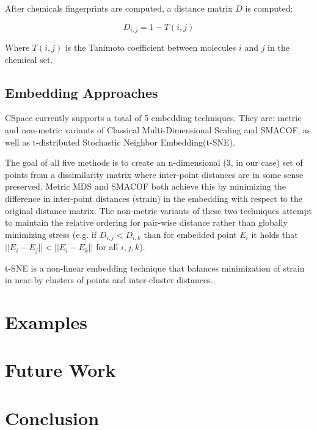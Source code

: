 \documentclass[12pt]{article}
\begin{document}
After chemicals fingerprints are computed, a distance matrix $D$ is computed:

\begin{equation}
  D_{i,j} = 1 - T(i,j)
\end{equation}

Where $T(i,j)$ is the Tanimoto coefficient between molecules $i$ and $j$ in the chemical set.

\subsection{Embedding Approaches}
CSpace currently supports a total of 5 embedding techniques. They are: metric and non-metric variants of Classical Multi-Dimensional Scaling and SMACOF, as well as t-distributed Stochastic Neighbor Embedding(t-SNE).

The goal of all five methods is to create an n-dimensional (3, in our case) set of points from a dissimilarity matrix where inter-point distances are in some sense preserved. Metric MDS and SMACOF both achieve this by minimizing the difference in inter-point distances (strain) in the embedding with respect to the original distance matrix. The non-metric variants of these two techniques attempt to maintain the relative ordering for pair-wise distance rather than globally minimizing stress (e.g. if $D_{i,j} < D_{i,k}$ than for embedded point $E_i$ it holds that $||E_i - E_j|| < ||E_i - E_k||$ for all $i, j, k$).

t-SNE is a non-linear embedding technique that balances minimization of strain in near-by clusters of points and inter-cluster distances.

\section{Examples}

\section{Future Work}

\section{Conclusion}

\newpage


\end{document}
